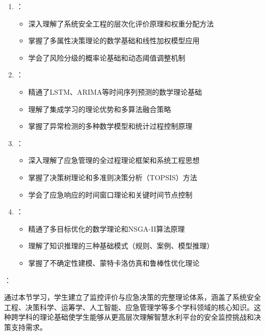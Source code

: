\begin{enumerate}
\def\labelenumi{\arabic{enumi}.}
\tightlist
\item
  ：

  \begin{itemize}
  \tightlist
  \item
    深入理解了系统安全工程的层次化评价原理和权重分配方法
  \item
    掌握了多属性决策理论的数学基础和线性加权模型应用
  \item
    学会了风险分级的概率论基础和动态阈值调整机制
  \end{itemize}
\item
  ：

  \begin{itemize}
  \tightlist
  \item
    精通了LSTM、ARIMA等时间序列预测的数学理论基础
  \item
    理解了集成学习的理论优势和多算法融合策略
  \item
    掌握了异常检测的多种数学模型和统计过程控制原理
  \end{itemize}
\item
  ：

  \begin{itemize}
  \tightlist
  \item
    深入理解了应急管理的全过程理论框架和系统工程思想
  \item
    掌握了决策树理论和多准则决策分析（TOPSIS）方法
  \item
    学会了应急响应的时间窗口理论和关键时间节点控制
  \end{itemize}
\item
  ：

  \begin{itemize}
  \tightlist
  \item
    精通了多目标优化的数学理论和NSGA-II算法原理
  \item
    理解了知识推理的三种基础模式（规则、案例、模型推理）
  \item
    掌握了不确定性建模、蒙特卡洛仿真和鲁棒性优化理论
  \end{itemize}
\end{enumerate}

：

通过本节学习，学生建立了监控评价与应急决策的完整理论体系，涵盖了系统安全工程、决策科学、运筹学、人工智能、应急管理学等多个学科领域的核心知识。这种跨学科的理论基础使学生能够从更高层次理解智慧水利平台的安全监控挑战和决策支持需求。

